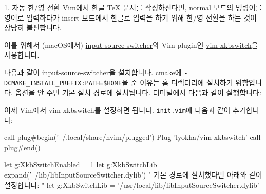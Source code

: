 \documentclass{beamer}
\begin{document}
\begin{frame}{1. 자동 한/영 전환}
  Vim에서 한글 \TeX{} 문서를 작성하신다면, normal 모드의 명령어를 영어로
  입력하다가 insert 모드에서 한글로 입력을 하기 위해 한/영 전환을 하는 것이
  상당히 불편합니다.

  이를 위해서 (macOS에서)
  \href{https://github.com/vovkasm/input-source-switcher}{input-source-switcher}와
  Vim plugin인 \href{https://github.com/lyokha/vim-xkbswitch}{vim-xkbswitch}을
  사용합니다.

  \framebreak
  다음과 같이 input-source-switcher을 설치합니다.
  cmake에 \verb/-DCMAKE_INSTALL_PREFIX:PATH=$HOME/을 준 이유는 홈 디렉터리에
  설치하기 위함입니다.
  옵션을 안 주면 기본 설치 경로에 설치됩니다.
  터미널에서 다음과 같이 실행합니다:

  \framebreak
  이제 Vim에서 vim-xkbswitch를 설정하면 됩니다.
  \verb/init.vim/에 다음과 같이 추가합니다:
  \begin{vimcode}
    call plug#begin('~/.local/share/nvim/plugged')
    Plug 'lyokha/vim-xkbswitch'
    call plug#end()

    let g:XkbSwitchEnabled = 1
    let g:XkbSwitchLib = expand('~/lib/libInputSourceSwitcher.dylib')
    " 기본 경로에 설치했다면 아래와 같이 설정합니다:
    " let g:XkbSwitchLib = '/usr/local/lib/libInputSourceSwitcher.dylib'
  \end{vimcode}
\end{frame}
\end{document}
